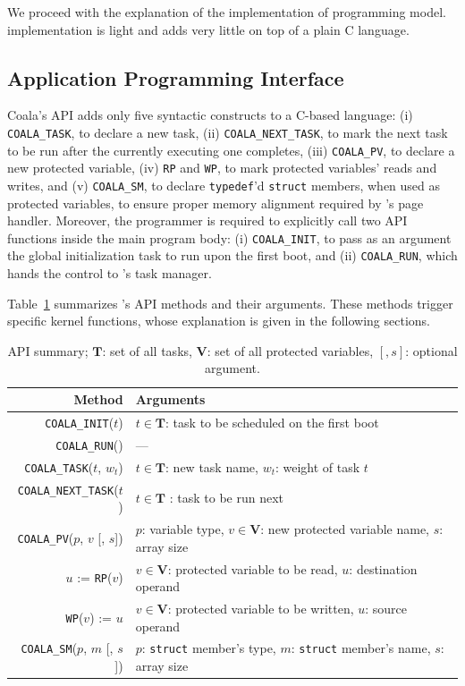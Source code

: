 We proceed with the explanation of the implementation of \sys programming model. \sys implementation is light and adds very little on top of a plain C language.

\subsection{\sys Application Programming Interface}
\label{sec:coala_api}

Coala's API adds only five syntactic constructs to a C-based language: (i) \texttt{COALA\_TASK}, to declare a new task, (ii) \texttt{COALA\_NEXT\_TASK}, to mark the next task to be run after the currently executing one completes, (iii) \texttt{COALA\_PV}, to declare a new protected variable, (iv) \texttt{RP} and \texttt{WP}, to mark protected variables' reads and writes, and (v) \texttt{COALA\_SM}, to declare \texttt{typedef}'d \texttt{struct} members, when used as protected variables, to ensure proper memory alignment required by \sys's page handler. Moreover, the programmer is required to explicitly call two API functions inside the main program body: (i) \texttt{COALA\_INIT}, to pass as an argument the global initialization task to run upon the first boot, and (ii) \texttt{COALA\_RUN}, which hands the control to \sys's task manager.

Table~\ref{table:coala_api} summarizes \sys's API methods and their arguments.  These methods trigger specific \sys kernel functions, whose explanation is given in the following sections.

\begin{table}
\centering
\begin{tabular}{| r | p{} |}
	\hline
	{Method} & {Arguments} \\
	\hline\hline
	\texttt{COALA\_INIT}($t$) & $t \in \mathbf{T}$: task to be scheduled on the first boot \\
	\hline
	\texttt{COALA\_RUN}() & --- \\
	\hline
	\texttt{COALA\_TASK}($t$, $w_t$) & $t \in \mathbf{T}$: new task name, $w_t$: weight of task $t$ \\
	\hline
	\texttt{COALA\_NEXT\_TASK}($t$) & $t \in \mathbf{T}$ : task to be run next \\
	\hline
	\texttt{COALA\_PV}($p$, $v$ [, $s$]) & $p$: variable type, $v \in \mathbf{V}$: new protected variable name, $s$: array size \\
	\hline
	$u$ := \texttt{RP}($v$) & $v \in \mathbf{V}$: protected variable to be read, $u$: destination operand \\
	\hline	
	\texttt{WP}($v$) := $u$ &  $v \in \mathbf{V}$: protected variable to be written, $u$: source operand \\
	\hline
	\texttt{COALA\_SM}($p$, $m$ [, $s$]) & $p$: \texttt{struct} member's type, $m$: \texttt{struct} member's name, $s$: array size \\
	\hline
\end{tabular}
\caption{API summary; $\mathbf{T}$: set of all tasks, $\mathbf{V}$: set of all protected variables, $[, s]$: optional argument.}
\label{table:coala_api}
\end{table}

